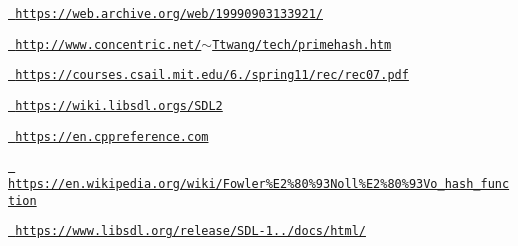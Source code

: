 \href{https://web.archive.org/web/19990903133921/}{\texttt{ https\+://web.\+archive.\+org/web/19990903133921/}}

\href{http://www.concentric.net/~Ttwang/tech/primehash.htm}{\texttt{ http\+://www.\+concentric.\+net/$\sim$\+Ttwang/tech/primehash.\+htm}}

\href{https://courses.csail.mit.edu/6.006/spring11/rec/rec07.pdf}{\texttt{ https\+://courses.\+csail.\+mit.\+edu/6./spring11/rec/rec07.\+pdf}}

\href{https://wiki.libsdl.orgs/SDL2}{\texttt{ https\+://wiki.\+libsdl.\+orgs/\+S\+D\+L2}}

\href{https://en.cppreference.com}{\texttt{ https\+://en.\+cppreference.\+com}}

\href{https://en.wikipedia.org/wiki/Fowler\%E2\%80\%93Noll\%E2\%80\%93Vo_hash_function}{\texttt{ https\+://en.\+wikipedia.\+org/wiki/\+Fowler\%\+E2\%80\%93\+Noll\%\+E2\%80\%93\+Vo\+\_\+hash\+\_\+function}}

\href{https://www.libsdl.org/release/SDL-1.2.15/docs/html/}{\texttt{ https\+://www.\+libsdl.\+org/release/\+S\+D\+L-\/1../docs/html/}} 